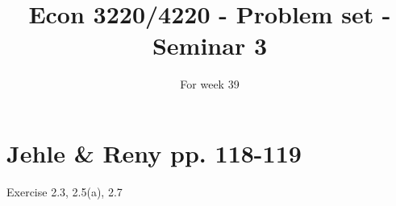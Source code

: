 \documentclass{article}
\title{Econ 3220/4220 - Problem set - Seminar 3 }
\date{For week 39}
\begin{document}
\maketitle


\section*{Jehle \& Reny pp. 118-119}

Exercise 2.3, 2.5(a), 2.7
\end{document}
